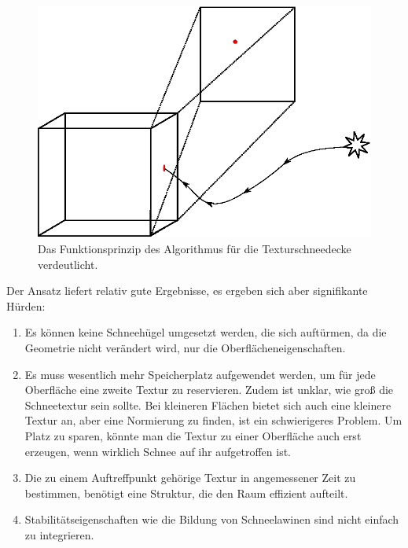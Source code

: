 \begin{figure}[h]
\centering
\includegraphics[width=12cm]{images/snow_cover_textures_principle}
\caption{Das Funktionsprinzip des Algorithmus für die Texturschneedecke verdeutlicht.}
\label{fig:implementation_fallen_snow_textures_principle}
\end{figure}

Der Ansatz liefert relativ gute Ergebnisse, es ergeben sich aber
signifikante Hürden:

\begin{enumerate}
\item Es können keine Schneehügel umgesetzt werden, die sich
auftürmen, da die Geometrie nicht verändert wird, nur die
Oberflächeneigenschaften.
\item Es muss wesentlich mehr Speicherplatz aufgewendet werden, um für
jede Oberfläche eine zweite Textur zu reservieren. Zudem ist unklar,
wie groß die Schneetextur sein sollte. Bei kleineren
Flächen bietet sich auch eine kleinere Textur an, aber eine Normierung
zu finden, ist ein schwierigeres Problem. Um Platz zu sparen, könnte
man die Textur zu einer Oberfläche auch erst erzeugen, wenn wirklich
Schnee auf ihr aufgetroffen ist.
\item Die zu einem Auftreffpunkt gehörige Textur in angemessener Zeit
zu bestimmen, benötigt eine Struktur, die den Raum effizient aufteilt.
\item Stabilitätseigenschaften wie die Bildung von Schneelawinen sind
nicht einfach zu integrieren.
\end{enumerate}

